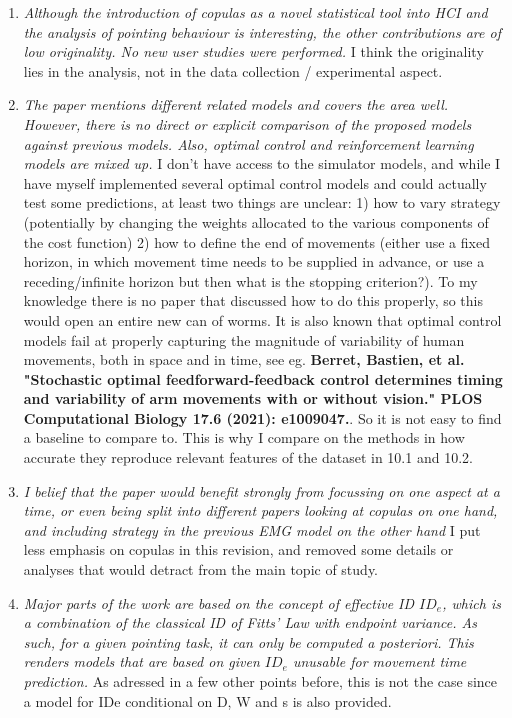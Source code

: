 \documentclass{article}
\begin{document}
\begin{enumerate}
    \item \textit{Although the introduction of copulas as a novel statistical tool into HCI and the analysis of pointing behaviour is interesting, the other contributions are of low originality. No new user studies were performed.} I think the originality lies in the analysis, not in the data collection / experimental aspect.
    \item \textit{The paper mentions different related models and covers the area well. However, there is no direct or explicit comparison of the proposed models against previous models. Also, optimal control and reinforcement learning models are mixed up.} I don't have access to the simulator models, and while I have myself implemented several optimal control models and could actually test some predictions, at least two things are unclear: 1) how to vary strategy (potentially by changing the weights allocated to the various components of the cost function) 2) how to define the end of movements (either use a fixed horizon, in which movement time needs to be supplied in advance, or use a receding/infinite horizon but then what is the stopping criterion?). To my knowledge there is no paper that discussed how to do this properly, so this would open an entire new can of worms. It is also known that optimal control models fail at properly capturing the magnitude of variability of human movements, both in space and in time, see eg. \textbf{Berret, Bastien, et al. "Stochastic optimal feedforward-feedback control determines timing and variability of arm movements with or without vision." PLOS Computational Biology 17.6 (2021): e1009047.}. So it is not easy to find a baseline to compare to. This is why I compare on the methods in how accurate they reproduce relevant features of the dataset in 10.1 and 10.2.
    \item \textit{I belief that the paper would benefit strongly from focussing on one aspect at a time, or even being split into different papers looking at copulas on one hand, and including strategy in the previous EMG model on the other hand} I put less emphasis on copulas in this revision, and removed some details or analyses that would detract from the main topic of study.
    \item \textit{Major parts of the work are based on the concept of effective ID $ID_e$, which is a combination of the classical ID of Fitts’ Law with endpoint variance. As such, for a given pointing task, it can only be computed a posteriori. This renders models that are based on given $ID_e$ unusable for movement time prediction. } As adressed in a few other points before, this is not the case since a model for IDe conditional on D, W and s is also provided.

\end{enumerate}
\end{document}
